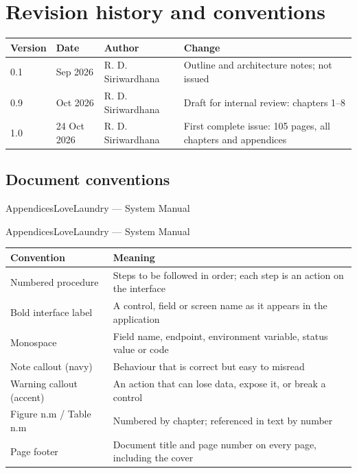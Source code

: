 \documentclass[11pt,a4paper,oneside]{book}
\begin{document}
\section*{Revision history and conventions}
\begin{center}\small
\begin{tabularx}{\linewidth}{|X|X|X|X|}
\hline
\rowcolor{lightgrey}
\textbf{Version} & \textbf{Date} & \textbf{Author} & \textbf{Change} \\ \hline
0.1 & Sep 2026 & R. D. Siriwardhana & Outline and architecture notes; not issued \\ \hline
0.9 & Oct 2026 & R. D. Siriwardhana & Draft for internal review: chapters 1–8 \\ \hline
1.0 & 24 Oct 2026 & R. D. Siriwardhana & First complete issue: 105 pages, all chapters and appendices \\ \hline
\end{tabularx}
\end{center}
\subsection*{Document conventions}
AppendicesLoveLaundry — System Manual

AppendicesLoveLaundry — System Manual

\begin{center}\small
\begin{tabularx}{\linewidth}{|X|X|}
\hline
\rowcolor{lightgrey}
\textbf{Convention} & \textbf{Meaning} \\ \hline
Numbered procedure & Steps to be followed in order; each step is an action on the interface \\ \hline
Bold interface label & A control, field or screen name as it appears in the application \\ \hline
Monospace & Field name, endpoint, environment variable, status value or code \\ \hline
Note callout (navy) & Behaviour that is correct but easy to misread \\ \hline
Warning callout (accent) & An action that can lose data, expose it, or break a control \\ \hline
Figure n.m / Table n.m & Numbered by chapter; referenced in text by number \\ \hline
Page footer & Document title and page number on every page, including the cover \\ \hline
\end{tabularx}
\end{center}
\end{document}
